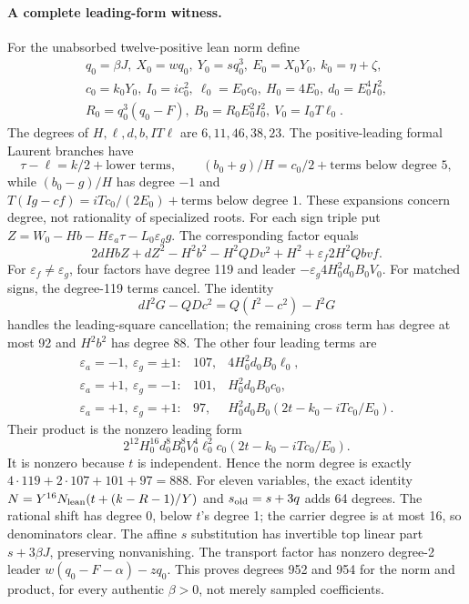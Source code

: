 \paragraph{A complete leading-form witness.}
For the unabsorbed twelve-positive lean norm define
\[
\begin{gathered}
 q_0=\beta J,\ X_0=wq_0,\ Y_0=sq_0^3,\ E_0=X_0Y_0,\ k_0=\eta+\zeta,\\
 c_0=k_0Y_0,\ I_0=ic_0^2,\ \ell_0=E_0c_0,\ H_0=4E_0,\ d_0=E_0^4I_0^2,\\
 R_0=q_0^3(q_0-F),\ B_0=R_0E_0^2I_0^2,\ V_0=I_0T\ell_0.
\end{gathered}
\]
The degrees of $H,\ell,d,b,IT\ell$ are $6,11,46,38,23$.
The positive-leading formal Laurent branches have
\[
 \tau-\ell=k/2+\text{lower terms},\qquad
 (b_0+g)/H=c_0/2+\text{terms below degree 5},
\]
while $(b_0-g)/H$ has degree $-1$ and
$T(Ig-cf)=iTc_0/(2E_0)+\text{terms below degree 1}$.
These expansions concern degree, not rationality of specialized roots.
For each sign triple put $Z=W_0-Hb-H\varepsilon_a\tau-L_0\varepsilon_g g$.
The corresponding factor equals
\[
 2dHbZ+dZ^2-H^2b^2-H^2QDv^2+H^2
       +\varepsilon_f2H^2Qbvf.
\]
For $\varepsilon_f\ne\varepsilon_g$, four factors have degree 119 and
leader $-\varepsilon_g4H_0^2d_0B_0V_0$.
For matched signs, the degree-119 terms cancel. The identity
\[
 dI^2G-QDc^2=Q(I^2-c^2)-I^2G
\]
handles the leading-square cancellation; the remaining cross term has degree
at most 92 and $H^2b^2$ has degree 88. The other four leading terms are
\[
\begin{array}{ccl}
\varepsilon_a=-1,\ \varepsilon_g=\pm1:&107,&4H_0^2d_0B_0\ell_0,\\
\varepsilon_a=+1,\ \varepsilon_g=-1:&101,&H_0^2d_0B_0c_0,\\
\varepsilon_a=+1,\ \varepsilon_g=+1:&97,&H_0^2d_0B_0(2t-k_0-iTc_0/E_0).
\end{array}
\]
Their product is the nonzero leading form
\[
 2^{12}H_0^{16}d_0^8B_0^8V_0^4\ell_0^2c_0
              (2t-k_0-iTc_0/E_0).
\]
It is nonzero because $t$ is independent. Hence the norm degree is exactly
$4\cdot119+2\cdot107+101+97=888$.
For eleven variables, the exact identity
$N=Y^{16}N_{\rm lean}(t+(k-R-1)/Y)$ and
$s_{\rm old}=s+3q$ adds 64 degrees. The rational shift has degree 0,
below $t$'s degree 1; the carrier degree is at most 16, so denominators clear.
The affine $s$ substitution has invertible top linear part $s+3\beta J$,
preserving nonvanishing. The transport factor has nonzero degree-2 leader
$w(q_0-F-\alpha)-zq_0$. This proves degrees 952 and 954 for the norm and
product, for every authentic $\beta>0$, not merely sampled coefficients.
